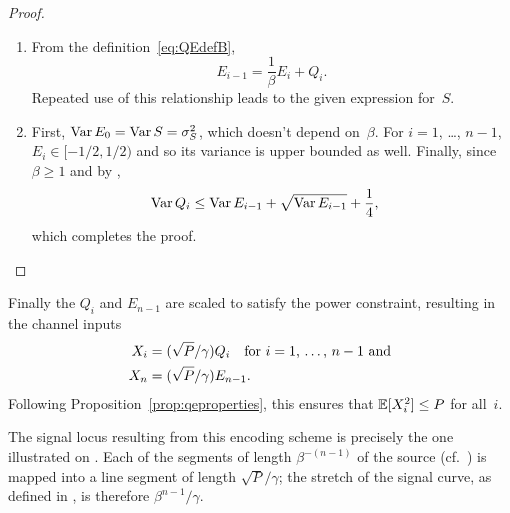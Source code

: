 \begin{proof}
  \begin{enumerate}
    \item From the definition~\eqref{eq:QEdefB}, 
    \begin{equation}
      \label{eq:reverserec}
      E_{i-1} = \frac{1}{\beta} E_i + Q_i.
    \end{equation}
    Repeated use of this relationship leads to the given expression for~$S$. 

  \item First, $\operatorname{Var} E_0 = \operatorname{Var} S = {\sigma_S^2}$, which doesn't depend
    on~$\beta$. For $i = 1$, \ldots, $n-1$, $E_i \in [-1/2, 1/2)$ and so its
    variance is upper bounded as well. Finally, since $\beta \ge 1$ and by
    , 
    \begin{align*}
      \operatorname{Var} Q_i &\le \operatorname{Var} E_{i-1} + \sqrt{\operatorname{Var} E_{i-1}} + \frac14,
    \end{align*}
    which completes the proof.
  \end{enumerate}
\end{proof}

Finally the $Q_i$ and $E_{n-1}$ are scaled to satisfy the power constraint,
resulting in the channel inputs
\begin{align}
  X_i &= (\sqrt{P}/\gamma) Q_i \quad
  \text{for $i = 1$, \dots, $n-1$ and} \nonumber\\
  X_n &= (\sqrt{P}/\gamma) E_{n-1}.
  \label{eq:Xdef}
\end{align}
Following Proposition~\ref{prop:qeproperties}, this ensures that $\mathbb{E}[X_i^2] \le
P$ for all~$i$. 

\begin{remark}
  \label{rem:sqgeometry}
  The signal locus resulting from this encoding scheme is precisely the one
  illustrated on . Each of the segments of length
  $\beta^{-(n-1)}$ of the source (cf.~) is mapped into a
  line segment of length $\sqrt{P}/\gamma$; the stretch of the signal curve, as
  defined in , is therefore $\beta^{n-1}/\gamma$.
\end{remark}



